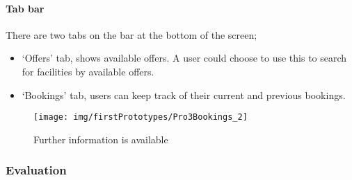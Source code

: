 
\paragraph{Tab bar}

There are two tabs on the bar at the bottom of the screen;
\begin{itemize}
	\item `Offers' tab, shows available offers. A user could choose to use
		this to search for facilities by available offers.
	\item `Bookings' tab, users can keep track of their current and previous
		bookings.
\end{itemize}

\begin{figure}[htpb]
	\centering
	\texttt{[image: img/firstPrototypes/Pro3Bookings\_2]}
	\caption{Further information is available}\label{fig:Pro3Bookings_2}
\end{figure}

\fullwidth%
\subsubsection{Evaluation}


